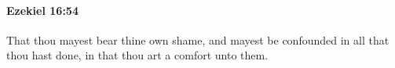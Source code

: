 
		\paragraph{Ezekiel 16:54} %
			\label{EZEKIEL-16-54}

			That thou mayest bear thine own shame, and mayest be confounded in all that thou hast done, in that thou art a comfort unto them.


